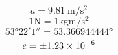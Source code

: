 \documentclass[12pt,a5paper]{book}
\begin{document}
\begin{equation}
a = \SI{9.81}{\metre\per\square\second}
\end{equation}
\begin{equation}
1\si{\newton} = 1\si{\kg\metre\per\square\second}
\end{equation}
\begin{equation}
\ang{53;22;1} = \ang{53,366944444}
\end{equation}
\begin{equation}
e = \num{+- 1.23e-6}
\end{equation}
\end{document}
